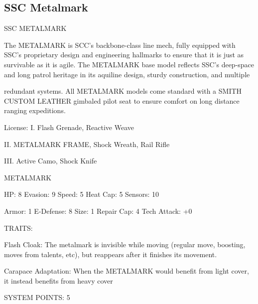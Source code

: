                                                                                                                      

\subsection{SSC Metalmark}
                                                                                                                          
                                             SSC METALMARK  

The METALMARK is SCC’s backbone-class line mech, fully equipped with SSC’s proprietary design and  
engineering hallmarks to ensure that it is just as survivable as it is agile. The METALMARK base model  
reflects SSC’s deep-space and long patrol heritage in its aquiline design, sturdy construction, and multiple  

redundant systems. All METALMARK models come standard with a SMITH CUSTOM LEATHER gimbaled  
pilot seat to ensure comfort on long distance ranging expeditions.   

                                                                                                                     


                                                     License:  
 I. Flash Grenade, Reactive Weave
 
 II. METALMARK FRAME, Shock Wreath, Rail Rifle
 
 III. Active Camo, Shock Knife
 

                                                METALMARK 

  HP: 8          Evasion: 9                             Speed: 5            Heat Cap: 5         Sensors: 10 

 Armor: 1        E-Defense: 8                           Size: 1             Repair Cap: 4       Tech Attack:  
                                                                                                +0 

                                                     TRAITS: 

  Flash Cloak: The metalmark is invisible while moving (regular move, boosting, moves from talents, etc),  
  but reappears after it finishes its movement.
 
  Carapace Adaptation: When the METALMARK would benefit from light cover, it instead benefits from  
  heavy cover 

                                              SYSTEM POINTS: 5 

